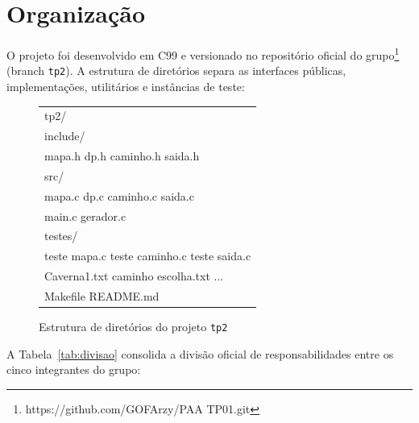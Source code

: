 \documentclass[12pt,a4paper]{article}
\makeatletter
\DeclareRobustCommand{\_}{%
  \ifmmode
    \nfss@text{\textunderscore}%
  \else
    \textunderscore\allowbreak
  \fi
}
\makeatother
\begin{document}

\section{Organização}

O projeto foi desenvolvido em C99 e versionado no repositório oficial do grupo\footnote{https://github.com/GOFArzy/PAA\_TP01.git} (branch \texttt{tp2}). A estrutura de diretórios separa as interfaces públicas, implementações, utilitários e instâncias de teste:

\begin{figure}[htbp]
    \centering
    \begin{minipage}{0.75\textwidth}
        \ttfamily\small
        \begin{tabular}{|l|}
        \hline
        tp2/ \\
        \quad include/ \\
        \quad \quad mapa.h \quad\quad\quad  dp.h \quad\quad\quad  caminho.h \quad\quad  saida.h \\
        \quad src/ \\
        \quad \quad mapa.c \quad\quad\quad  dp.c \quad\quad\quad  caminho.c \quad\quad   saida.c \\
        \quad \quad main.c \quad\quad\quad  gerador.c \\
        \quad testes/ \\
        \quad \quad teste\_mapa.c \quad  teste\_caminho.c \quad  teste\_saida.c \\
        \quad \quad Caverna1.txt \quad  caminho\_escolha.txt \quad  ... \\
        \quad Makefile \quad  README.md \\
        \hline
        \end{tabular}
    \end{minipage}
    \vspace{0.2cm}
    \caption{Estrutura de diretórios do projeto \texttt{tp2}}
    \label{fig:estrutura}
\end{figure}

A Tabela~\ref{tab:divisao} consolida a divisão oficial de responsabilidades entre os cinco integrantes do grupo:
\end{document}
